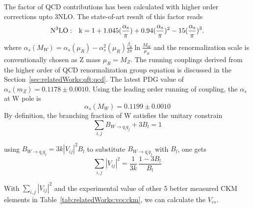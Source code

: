\noindent The factor of QCD contributions has been calculated with higher order corrections upto 3NLO. The state-of-art result of this factor reads 
\begin{equation}
	\rm{N^3LO:} \quad k = 1+1.045 ( \frac{\alpha_s}{\pi} ) + 0.94  ( \frac{\alpha_s}{\pi} ) ^2 -15  ( \frac{\alpha_s}{\pi} ) ^3.
\end{equation}
\noindent where $\alpha_s(M_W) = \alpha_s(\mu_R) - \alpha^2_s(\mu_R) \frac{ \beta_0}{2\pi} \ln \frac{M_W}{\mu_R}$ and the renormalization scale is conventionally chosen as Z mass $\mu_R=M_Z$. The running couplings derived from the higher order of QCD renormalization group equation is discussed in the Section~\ref{sec:relatedWorks:qft:qcd}. The latest PDG value of $\alpha_s(m_Z)=0.1178\pm0.0010$. Using the leading order running of coupling, the $\alpha_s$ at W pole is
\begin{equation}
	\alpha_s(M_W) = 0.1199 \pm 0.0010
\end{equation}
By definition, the branching fraction of W satisfies the unitary constrain
\begin{equation}
    \sum_{ i,j } B_{W \to q_i q_j} + 3 B_l = 1
\end{equation}

\noindent using  $B_{W \to q_i q_j} = 3 k |V_{ij}|^2 B_l $ to substitute $B_{W \to q_i q_j}$  with $B_l$, one gets
\begin{equation}
    \sum_{ i,j } |V_{ij}|^2 = \frac{1}{ 3k} \, \frac{1-3B_l}{B_l}
\end{equation}



\noindent  With $\sum_{ i,j } |V_{ij}|^2$ and the experimental value of other 5 better measured CKM elements \cite{pdg2020} in Table~\ref{tab:relatedWorks:vcs:ckm}, we can calculate the $V_{cs}$.



